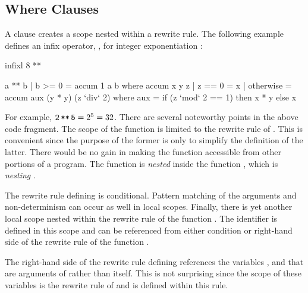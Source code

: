 \subsection{{\selectfont Where} Clauses}
\label{where-clause}

A 
clause creates a scope nested within a rewrite rule.
The following example defines an infix operator, \ccode{**}, for
integer exponentiation
:
%
\begin{curry}
infixl 8 **

a ** b | b >= 0 = accum 1 a b
   where accum x y z | z == 0    = x
                     | otherwise = accum aux (y * y) (z `div` 2)
           where aux = if (z `mod` 2 == 1) then x * y else x
\end{curry}
%
For example, $\code{2\,**\,5}=2^5=32$.
There are several noteworthy points in the above code fragment.
The scope of the function  is limited to
the rewrite rule of \ccode{**}.
This is convenient since the purpose of the former
is only to simplify the definition of the latter.
There would be no gain in making the function 
accessible from other portions of a program.
The function  is \emph{nested}
inside the function \ccode{**}, which is \emph{nesting} .  

The rewrite rule defining  is conditional.
Pattern matching of the arguments and non-determinism
can occur as well in local scopes.
Finally, there is yet another local scope nested
within the rewrite rule of the function .
The identifier  is defined in this scope
and can be referenced from either condition or right-hand side
of the rewrite rule of the function .

The right-hand side of the rewrite rule defining 
references the variables ,  and 
that are arguments of  rather than  itself.
This is not surprising since the scope of these variables
is the rewrite rule of  and 
is defined within this rule.

